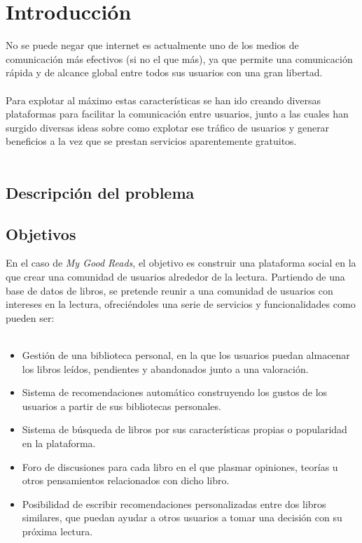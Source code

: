 \chapter{Introducción}

No se puede negar que internet es actualmente uno de los medios de comunicación más efectivos (si no el que más), ya que permite una comunicación rápida y de alcance global entre todos sus usuarios con una gran libertad.
\\\\
Para explotar al máximo estas características se han ido creando diversas plataformas para facilitar la comunicación entre usuarios, junto a las cuales han surgido diversas ideas sobre como explotar ese tráfico de usuarios y generar beneficios a la vez que se prestan servicios aparentemente gratuitos.
\\\\
\section{Descripción del problema}

\section{Objetivos}
En el caso de \textit{My Good Reads}, el objetivo es construir una plataforma social en la que crear una comunidad de usuarios alrededor de la lectura. Partiendo de una base de datos de libros, se pretende reunir a una comunidad de usuarios con intereses en la lectura, ofreciéndoles una serie de servicios y funcionalidades como pueden ser:
\\\\
\begin{itemize}
    \item Gestión de una biblioteca personal, en la que los usuarios puedan almacenar los libros leídos, pendientes y abandonados junto a una valoración.
    \item Sistema de recomendaciones automático construyendo los gustos de los usuarios a partir de sus bibliotecas personales.
    \item Sistema de búsqueda de libros por sus características propias o popularidad en la plataforma.
    \item Foro de discusiones para cada libro en el que plasmar opiniones, teorías u otros pensamientos relacionados con dicho libro.
    \item Posibilidad de escribir recomendaciones personalizadas entre dos libros similares, que puedan ayudar a otros usuarios a tomar una decisión con su próxima lectura.
\end{itemize}

